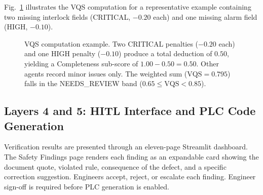 \documentclass[journal]{IEEEtran}
\begin{document}
Fig.~\ref{fig:vqs} illustrates the VQS computation for a representative example
containing two missing interlock fields (CRITICAL, $-0.20$ each) and one missing
alarm field (HIGH, $-0.10$).

\begin{figure}[!t]
\centering
{}
\caption{VQS computation example. Two CRITICAL penalties ($-0.20$ each) and one
HIGH penalty ($-0.10$) produce a total deduction of $0.50$, yielding a
Completeness sub-score of $1.00 - 0.50 = 0.50$. Other agents record minor
issues only. The weighted sum ($\text{VQS}=0.795$) falls in the NEEDS\_REVIEW
band ($0.65 \leq \text{VQS} < 0.85$).}
\label{fig:vqs}
\end{figure}

\subsection{Layers 4 and 5: HITL Interface and PLC Code Generation}

Verification results are presented through an eleven-page Streamlit dashboard.
The Safety Findings page renders each finding as an expandable card showing the
document quote, violated rule, consequence of the defect, and a specific
correction suggestion. Engineers accept, reject, or escalate each finding.
Engineer sign-off is required before PLC generation is enabled.
\end{document}
